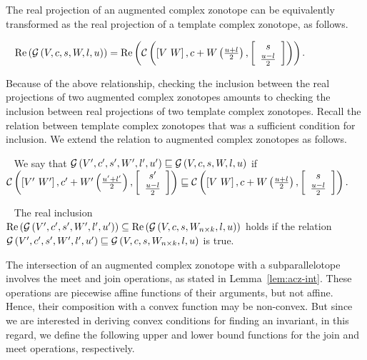 The real projection of an augmented complex zonotope can be
equivalently transformed as the real projection of a template complex
zonotope, as follows.
%
\begin{lemma}~\label{lem:conversion}
$\operatorname{\operatorname{Re}}\left(\mathcal{G}\left(V,c,s,W,l,u\right)\right) = \operatorname{\operatorname{Re}}\left(\mathcal{C}\left(\left[V~W\right],c+W\left(\frac{u+l}{2}\right),\left[\begin{array}{c}{s}\\{\frac{u-l}{2}} \end{array}\right]\right)\right)$.
\end{lemma}
%
Because of the above relationship, checking the inclusion between the
real projections of two augmented complex zonotopes amounts to
checking the inclusion between real projections of two template
complex zonotopes.  Recall the relation between template complex
zonotopes that was a sufficient condition for inclusion.  We extend
the relation to augmented complex zonotopes as follows.
%
\begin{definition}~\label{defn:gcz-order}
We say that $\mathcal{G}\left(V^\prime,c^\prime,s^\prime,W^\prime,l^\prime,u^\prime\right)\sqsubseteq
\mathcal{G}\left(V,c,s,W,l,u\right)$ if\\ $\mathcal{C}\left(\left[V^\prime~W^\prime\right],c^\prime+W^\prime\left(\frac{u^\prime+l^\prime}{2}\right),\left[\begin{array}{c}{s^\prime}\\{\frac{u-l}{2}} \end{array}\right]\right)
\sqsubseteq
\mathcal{C}\left(\left[V~W\right],c+W\left(\frac{u+l}{2}\right),\left[\begin{array}{c}{s}\\{\frac{u-l}{2}} \end{array}\right]\right).$
\end{definition}
%
\begin{lemma}~\label{lem:gcz-gcz} The real inclusion\\
$\operatorname{\operatorname{Re}}\left(\mathcal{G}\left(V^\prime,c^\prime,s^\prime,W^\prime,l^\prime,u^\prime\right)\right)\subseteq \operatorname{\operatorname{Re}}\left(\mathcal{G}\left(V,c,s,W_{n\times
k},l,u\right)\right)$ holds if the relation\\
$\mathcal{G}\left(V^\prime,c^\prime,s^\prime,W^\prime,l^\prime,u^\prime\right)\sqsubseteq \mathcal{G}\left(V,c,s,W_{n\times
k},l,u\right)$ is true.
\end{lemma}

The intersection of an augmented complex zonotope with a
subparallelotope involves the meet and join operations, as stated in
Lemma~\ref{lem:acz-int}.  These operations are piecewise affine
functions of their arguments, but not affine.  Hence, their
composition with a convex function may be non-convex.  But since we
are interested in deriving convex conditions for finding an invariant,
in this regard, we define the following upper and lower bound
functions for the join and meet operations, respectively.

